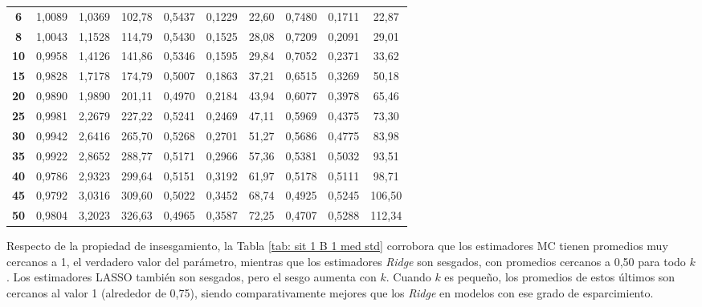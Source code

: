 \documentclass[a4paper,12pt]{report}
\begin{document}
\begin{table}[H]
\begin{tabular}{c|ccc|ccc|ccc}
\textbf{6} & 1,0089 & 1,0369 & 102,78 & 0,5437 & 0,1229 & 22,60 & 0,7480 & 0,1711 & \hspace{0.05cm} 22,87 \\
\textbf{8} & 1,0043 & 1,1528 & 114,79 & 0,5430 & 0,1525 & 28,08 & 0,7209 & 0,2091 & \hspace{0.05cm} 29,01 \\
\textbf{10} & 0,9958 & 1,4126 & 141,86 & 0,5346 & 0,1595 & 29,84 & 0,7052 & 0,2371 & \hspace{0.05cm} 33,62 \\
\textbf{15} & 0,9828 & 1,7178 & 174,79 & 0,5007 & 0,1863 & 37,21 & 0,6515 & 0,3269 & \hspace{0.05cm} 50,18 \\
\textbf{20} & 0,9890 & 1,9890 & 201,11 & 0,4970 & 0,2184 & 43,94 & 0,6077 & 0,3978 & \hspace{0.05cm} 65,46 \\
\textbf{25} & 0,9981 & 2,2679 & 227,22 & 0,5241 & 0,2469 & 47,11 & 0,5969 & 0,4375 & \hspace{0.05cm} 73,30 \\
\textbf{30} & 0,9942 & 2,6416 & 265,70 & 0,5268 & 0,2701 & 51,27 & 0,5686 & 0,4775 & \hspace{0.05cm} 83,98 \\
\textbf{35} & 0,9922 & 2,8652 & 288,77 & 0,5171 & 0,2966 & 57,36 & 0,5381 & 0,5032 & \hspace{0.05cm} 93,51 \\
\textbf{40} & 0,9786 & 2,9323 & 299,64 & 0,5151 & 0,3192 & 61,97 & 0,5178 & 0,5111 & \hspace{0.05cm} 98,71 \\
\textbf{45} & 0,9792 & 3,0316 & 309,60 & 0,5022 & 0,3452 & 68,74 & 0,4925 & 0,5245 & 106,50 \\
\textbf{50} & 0,9804 & 3,2023 & 326,63 & 0,4965 & 0,3587 & 72,25 & 0,4707 & 0,5288 & 112,34
\end{tabular}
\end{table}

Respecto de la propiedad de insesgamiento, la Tabla \ref{tab: sit 1 B 1 med std} corrobora que los estimadores MC tienen promedios muy cercanos a 1, el verdadero valor del parámetro, mientras que los estimadores \textit{Ridge} son sesgados, con promedios cercanos a 0,50 para todo $k$. Los estimadores LASSO también son sesgados, pero el sesgo aumenta con $k$. Cuando $k$ es pequeño, los promedios de estos últimos son cercanos al valor 1 (alrededor de 0,75), siendo comparativamente mejores que los \textit{Ridge} en modelos con ese grado de esparcimiento.
\end{document}
